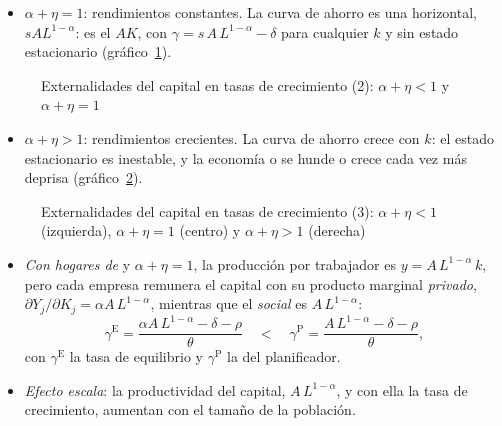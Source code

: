 \documentclass[11pt]{article}
\begin{document}
\begin{itemize}
\item \emph{$\alpha+\eta=1$}: rendimientos constantes. La curva de ahorro es una horizontal, $sAL^{1-\alpha}$: es el $AK$, con $\gamma=s\,A\,L^{1-\alpha}-\delta$ para cualquier $k$ y sin estado estacionario (gráfico~\ref{fig:externalidades-2}).
\end{itemize}

\begin{figure}[H]
\centering
\caption{Externalidades del capital en tasas de crecimiento (2): $\alpha+\eta<1$ y $\alpha+\eta=1$}\label{fig:externalidades-2}
\end{figure}

\begin{itemize}
\item \emph{$\alpha+\eta>1$}: rendimientos crecientes. La curva de ahorro crece con $k$: el estado estacionario es inestable, y la economía o se hunde o crece cada vez más deprisa (gráfico~\ref{fig:externalidades}).
\end{itemize}

\begin{figure}[H]
\centering
\caption{Externalidades del capital en tasas de crecimiento (3): $\alpha+\eta<1$ (izquierda), $\alpha+\eta=1$ (centro) y $\alpha+\eta>1$ (derecha)}\label{fig:externalidades}
\end{figure}

\begin{itemize}
\item \emph{Con hogares de } y $\alpha+\eta=1$, la producción por trabajador es $y=A\,L^{1-\alpha}\,k$, pero cada empresa remunera el capital con su producto marginal \emph{privado}, $\partial Y_j/\partial K_j=\alpha A\,L^{1-\alpha}$, mientras que el \emph{social} es $A\,L^{1-\alpha}$:
  \[\gamma^{\mathrm E}=\frac{\alpha A\,L^{1-\alpha}-\delta-\rho}{\theta}\quad<\quad\gamma^{\mathrm P}=\frac{A\,L^{1-\alpha}-\delta-\rho}{\theta},\]
  con $\gamma^{\mathrm E}$ la tasa de equilibrio y $\gamma^{\mathrm P}$ la del planificador.
\item \emph{Efecto escala}: la productividad del capital, $A\,L^{1-\alpha}$, y con ella la tasa de crecimiento, aumentan con el tamaño de la población\nocite{BarroSalaiMartin2004}.
\end{itemize}
\end{document}
